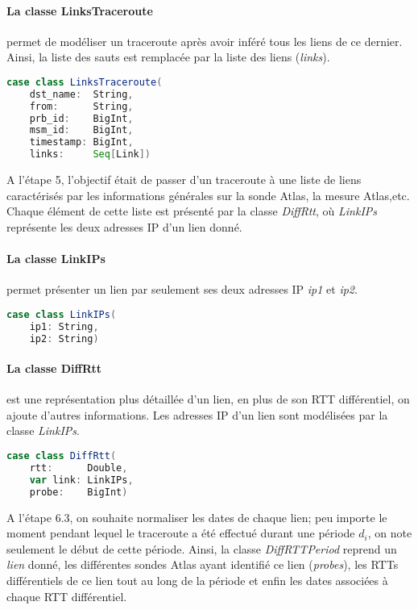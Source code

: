 \paragraph{La classe LinksTraceroute} permet de modéliser un traceroute après avoir inféré tous les liens de ce dernier. Ainsi, la liste des sauts est remplacée par la liste des liens (\textit{links}). 

\begin{lstlisting}[language=scala]
case class LinksTraceroute(
	dst_name:  String,
	from:      String,
	prb_id:    BigInt,
	msm_id:    BigInt,
	timestamp: BigInt,
	links:     Seq[Link])
\end{lstlisting}


A l'étape 5, l'objectif était de passer d'un traceroute à une liste de liens caractérisés par les informations générales sur la sonde Atlas, la mesure Atlas,etc. Chaque élément de cette liste est présenté par la classe \textit{DiffRtt}, où \textit{LinkIPs} représente les deux adresses IP d'un lien donné.
\paragraph{La classe LinkIPs} permet présenter un lien par seulement ses deux adresses IP \textit{ip1} et \textit{ip2}.
\begin{lstlisting}[language=scala]
case class LinkIPs(
	ip1: String,
	ip2: String)
\end{lstlisting}

\paragraph{La classe DiffRtt} est une représentation plus détaillée d'un lien, en plus de son RTT différentiel, on ajoute d'autres informations.  Les adresses IP d'un lien sont modélisées par la classe \textit{LinkIPs}.

\begin{lstlisting}[language=scala]
case class DiffRtt(
	rtt:      Double,
	var link: LinkIPs,
	probe:    BigInt)
\end{lstlisting}

A l'étape 6.3, on souhaite normaliser les dates de chaque lien; peu importe le moment pendant lequel le traceroute a été effectué durant une période $d_i$, on note seulement le début de cette période. Ainsi,  la classe  \textit{DiffRTTPeriod}  reprend un \textit{lien} donné, les différentes sondes Atlas ayant identifié ce lien (\textit{probes}), les RTTs différentiels de ce lien tout au long de la période et enfin les dates associées à chaque RTT différentiel.
